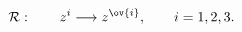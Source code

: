 \begin{equation}
{\cal R}: \qquad z^i \longrightarrow z^{\ov{i}}, \qquad i=1,2,3.     \nonumber
\end{equation}

